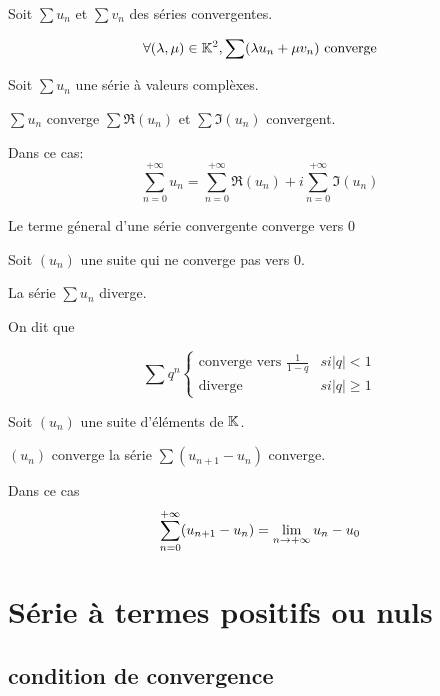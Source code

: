 \begin{prp}
Soit $\sum u_n$ et $\sum v_n$ des séries convergentes.

\[
    \forall (\lambda, \mu) \in \mathbb{K}^2, \sum (\lambda u_n + \mu v_n)
    \text{ converge}
\]
\end{prp}

\begin{prp}
Soit $\sum u_n$ une série à valeurs complèxes.

$\sum u_n$ converge \ssi $\sum \Re(u_n)$ et $\sum \Im(u_n)$ convergent.

Dans ce cas:
\[
    \sum^{+\infty}_{n = 0} u_n = \sum^{+\infty}_{n = 0} \Re(u_n) 
    + i \sum^{+\infty}_{n = 0} \Im(u_n)
\]
\end{prp}

\begin{prp}
Le terme géneral d'une série convergente converge vers $0$
\end{prp}

\begin{prp}
Soit $(u_n)$ une suite qui ne converge pas vers $0$.

La série $\sum u_n$ diverge.

On dit que 
\end{prp}

\begin{prp}
\[
\sum q^n \begin{cases}
    \text{converge vers } \frac{1}{1 - q}   & si |q| < 1 \\
    \text{diverge}                          & si |q| \geq 1
\end{cases}
\]
\end{prp}

\begin{prp}
Soit $(u_n)$ une suite d'éléments de $\mathbb{K}$.

$(u_n)$ converge \ssi la série $\sum(u_{n + 1} - u_n)$ converge.

Dans ce cas
\[
    \sum^{+\infty}_{n = 0} (u_{n + 1} - u_n) = \lim\limits_{n \to +\infty} u_n - u_0
\]
\end{prp}

\section{Série à termes positifs ou nuls}

\subsection{condition de convergence}

